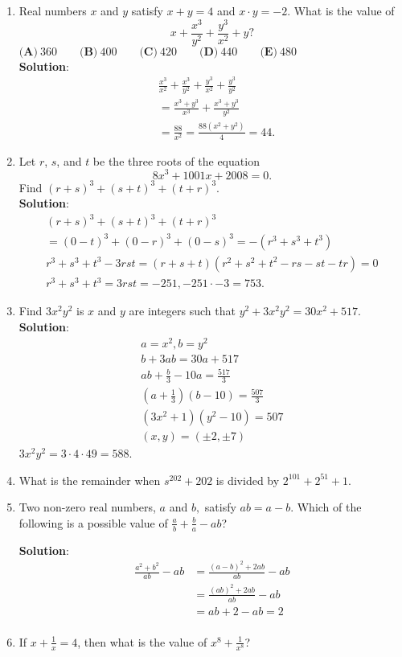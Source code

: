 \begin{enumerate}
  \item Real numbers $x$ and $y$ satisfy $x + y = 4$ and $x \cdot y = -2$. What is the value of\[x + \frac{x^3}{y^2} + \frac{y^3}{x^2} + y?\]
  $\textbf{(A)}\ 360\qquad\textbf{(B)}\ 400\qquad\textbf{(C)}\ 420\qquad\textbf{(D)}\ 440\qquad\textbf{(E)}\ 480$
  \\ \textbf{Solution}:
  \begin{align*}
    &\frac{x^3}{x^2}+\frac{x^3}{y^2}+\frac{y^3}{x^2}+\frac{y^3}{y^2} \\
    &= \frac{x^3+y^3}{x^3}+\frac{x^3+y^3}{y^2} \\
    &= \frac{88}{x^2} = \frac{88(x^2+y^2)}{4} = \boxed{44}.
  \end{align*}
  \item Let $r$, $s$, and $t$ be the three roots of the equation\[8x^3 + 1001x + 2008 = 0.\]Find $(r + s)^3 + (s + t)^3 + (t + r)^3$.
  \\ \textbf{Solution}:
  \begin{align*}
    (r+s)^3 + (s+t)^3 + (t+r)^3  \\ = (0-t)^3 + (0-r)^3 + (0-s)^3 = -(r^3 + s^3 + t^3) \\
    r^3 + s^3 + t^3 - 3rst = (r+s+t)(r^2 + s^2 + t^2 - rs - st - tr) = 0 \\
    r^3+s^3+t^3 = 3rst = -251, -251 \cdot -3 = \boxed{753}.
  \end{align*}
  \item Find $3x^2y^2$ is $x$ and $y$ are integers such that $y^2+3x^2y^2=30x^2+517$.
  \\ \textbf{Solution}:
  \begin{align*}
    a = x^2, b = y^2 \\
    b+3ab = 30a+517 \\
    ab + \frac{b}{3} - 10a = \frac{517}{3} \\
    (a+\frac{1}{3})(b-10) = \frac{507}{3} \\
    (3x^2 + 1)(y^2 - 10) = 507 \\
    (x, y) = (\pm 2, \pm 7)
  \end{align*}
  $3x^2y^2 = 3 \cdot 4 \cdot 49 = \boxed{588}$.
  \item What is the remainder when $s^{202} + 202$ is divided by $2^{101} + 2^{51} + 1$.
  \item Two non-zero real numbers, $a$ and $b,$ satisfy $ab = a - b$. Which of the following is a possible value of $\frac {a}{b} + \frac {b}{a} - ab$?

  \textbf{Solution}:
  \begin{align*}
    \frac{a^2 + b^2}{ab} - ab &= \frac{(a-b)^2+2ab}{ab} - ab \\
    &= \frac{(ab)^2 + 2ab}{ab} - ab \\
    &= ab + 2 - ab = \boxed{2} \\
  \end{align*}
  \item If $x + \frac{1}{x} = 4$, then what is the value of $x^8 + \frac{1}{x^8}$?


\end{enumerate}
